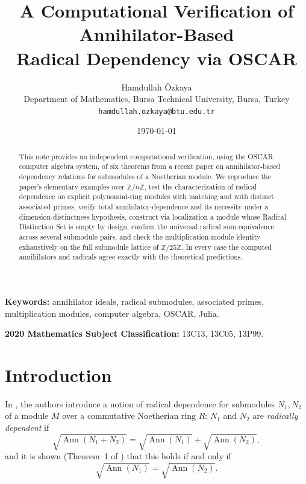 \documentclass[11pt]{article}
\title{A Computational Verification of Annihilator-Based\\
Radical Dependency via OSCAR}
\author{Hamdullah \"Ozkaya\\
\small Department of Mathematics, Bursa Technical University, Bursa, Turkey\\
\small \texttt{hamdullah.ozkaya@btu.edu.tr}}
\date{\today}
\begin{document}
\maketitle

\begin{abstract}
This note provides an independent computational verification, using the
OSCAR computer algebra system, of six theorems from a recent paper on
annihilator-based dependency relations for submodules of a Noetherian
module. We reproduce the paper's elementary examples over
$\mathbb{Z}/n\mathbb{Z}$, test the characterization of radical dependence
on explicit polynomial-ring modules with matching and with distinct
associated primes, verify total annihilator-dependence and its necessity
under a dimension-distinctness hypothesis, construct via localization a
module whose Radical Distinction Set is empty by design, confirm the
universal radical sum equivalence across several submodule pairs, and
check the multiplication-module identity exhaustively on the full
submodule lattice of $\mathbb{Z}/25\mathbb{Z}$. In every case the
computed annihilators and radicals agree exactly with the theoretical
predictions.
\end{abstract}

\textbf{Keywords:} annihilator ideals, radical submodules, associated
primes, multiplication modules, computer algebra, OSCAR, Julia.

\textbf{2020 Mathematics Subject Classification:} 13C13, 13C05, 13P99.

\section{Introduction}

In \cite{pekin-ozkaya-2026}, the authors introduce a notion of radical
dependence for submodules $N_1, N_2$ of a module $M$ over a commutative
Noetherian ring $R$: $N_1$ and $N_2$ are \emph{radically dependent} if
\[
  \sqrt{\operatorname{Ann}(N_1+N_2)} = \sqrt{\operatorname{Ann}(N_1)} +
  \sqrt{\operatorname{Ann}(N_2)},
\]
and it is shown (Theorem~1 of \cite{pekin-ozkaya-2026}) that this holds if
and only if
\[
  \sqrt{\operatorname{Ann}(N_1)} = \sqrt{\operatorname{Ann}(N_2)}.
\]
\end{document}
